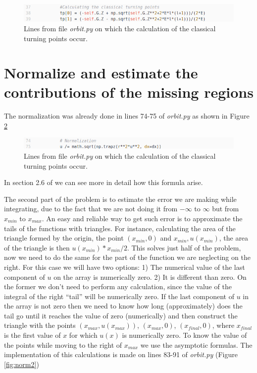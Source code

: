 \documentclass[12pt]{article}
\begin{document}
\begin{figure}[h!]
    \centering
    \includegraphics[width=\linewidth]{tp}
    \caption{Lines from file \textit{orbit.py} on which the calculation of the classical turning points occur.}
    \label{fig:tpcalc}
\end{figure}

\section{Normalize and estimate the contributions of the missing regions}

The normalization was already done in lines 74-75 of \textit{orbit.py} as shown in Figure \ref{fig:norm}

\begin{figure}[h!]
    \centering
    \includegraphics[width=\linewidth]{norm}
    \caption{Lines from file \textit{orbit.py} on which the calculation of the classical turning points occur.}
    \label{fig:norm}
\end{figure}

In section 2.6 of \cite{zhangQ} we can see more in detail how this formula arise.

The second part of the problem is to estimate the error we are making while integrating, due to the fact that we are not doing it from $-\infty$ to $\infty$ but from $x_{min}$ to $x_{max}$. An easy and reliable way to get such error is to approximate the tails of the functions with triangles. For instance, calculating the area of the triangle formed by the origin, the point $(x_{min},0)$ and $x_{min}, u(x_{min})$, the area of the triangle is then $u(x_{min})*x_{min}/2$. This solves just half of the problem, now we need to do the same for the part of the function we are neglecting on the right. For this case we will have two options: 1) The numerical value of the last component of $u$ on the array is numerically zero. 2) It is different than zero. On the former we don't need to perform any calculation, since the value of the integral of the right ``tail'' will be numerically zero. If the last component of $u$ in the array is not zero then we need to know how long (approximately) does the tail go until it reaches the value of zero (numerically) and then construct the triangle with the points $(x_{max},u(x_{max}))$, $(x_{max},0)$, $(x_{final},0)$, where $x_{final}$ is the first value of $x$ for which $u(x)$ is numerically zero. To know the value of the points while moving to the right of $x_{max}$ we use the asymptotic formulas. The implementation of this calculations is made on lines 83-91 of \textit{orbit.py} (Figure \ref{fig:norm2})   
\end{document}
